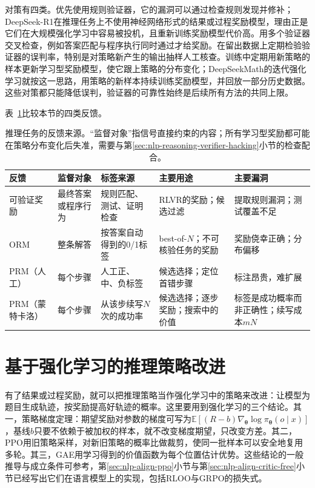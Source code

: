 对策有四类。优先使用规则验证器，它的漏洞可以通过检查规则发现并修补；DeepSeek-R1在推理任务上不使用神经网络形式的结果或过程奖励模型，理由正是它们在大规模强化学习中容易被投机，且重新训练奖励模型代价高。用多个验证器交叉检查，例如答案匹配与程序执行同时通过才给奖励。在留出数据上定期检验验证器的误判率，特别是对策略新产生的输出抽样人工核查。训练中定期用新策略的样本更新学习型奖励模型，使它跟上策略的分布变化；DeepSeekMath的迭代强化学习就按这一思路，用策略的新样本持续训练奖励模型，并回放一部分历史数据。这些对策都只能降低误判，验证器的可靠性始终是后续所有方法的共同上限。

表~\ref{tab:nlp-reasoning-reward-types}比较本节的四类反馈。

\begin{table}[tbp]
  \centering
  \small
  \caption{推理任务的反馈来源。“监督对象”指信号直接约束的内容；所有学习型奖励都可能在策略分布变化后失准，需要与第\ref{sec:nlp-reasoning-verifier-hacking}小节的检查配合。}
  \label{tab:nlp-reasoning-reward-types}
  \begin{tabularx}{\linewidth}{@{}p{24mm}p{24mm}p{36mm}Xp{34mm}@{}}
    \toprule
    反馈 & 监督对象 & 标签来源 & 主要用途 & 主要漏洞\\
    \midrule
    可验证奖励 & 最终答案或程序行为 & 规则匹配、测试、证明检查 & RLVR的奖励；候选过滤 & 提取规则漏洞；测试覆盖不足\\
    ORM & 整条解答 & 按答案自动得到的0/1标签 & best-of-$N$；不可核验任务的奖励 & 奖励侥幸正确；分布偏移\\
    PRM（人工） & 每个步骤 & 人工正、中、负标签 & 候选选择；定位首错步骤 & 标注昂贵，难扩展\\
    PRM（蒙特卡洛） & 每个步骤 & 从该步续写$N$次的成功率 & 候选选择；逐步奖励；搜索中的价值 & 标签是成功概率而非正确性；续写成本$mN$\\
    \bottomrule
  \end{tabularx}
\end{table}

\section{基于强化学习的推理策略改进}
\label{sec:nlp-reasoning-rl}

有了结果或过程奖励，就可以把推理策略当作强化学习中的策略来改进：让模型为题目生成轨迹，按奖励提高好轨迹的概率。这里要用到强化学习的三个结论。其一，策略梯度定理：期望奖励对参数的梯度可写为$\mathbb E[(R-b)\nabla_{\bm\theta}\log\pi_{\bm\theta}(o\mid x)]$，基线$b$只要不依赖于被加权的样本，就不改变梯度期望，只改变方差。其二，PPO用旧策略采样，对新旧策略的概率比做裁剪，使同一批样本可以安全地复用多轮。其三，GAE用学习得到的价值函数为每个位置估计优势。这些结论的一般推导与成立条件可参考，第\ref{sec:nlp-align-ppo}小节与第\ref{sec:nlp-align-critic-free}小节已经写出它们在语言模型上的实现，包括RLOO与GRPO的损失式。

